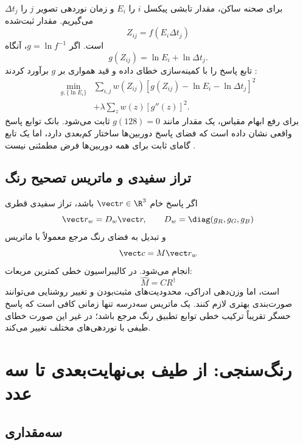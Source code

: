 برای صحنه ساکن، مقدار تابشی پیکسل \(i\) را \(E_i\) و زمان نوردهی تصویر \(j\) را \(\Delta t_j\)
می‌گیریم. مقدار ثبت‌شده
\begin{equation}
Z_{ij}=f(E_i\Delta t_j)
\end{equation}
است. اگر \(g=\ln f^{-1}\)، آنگاه
\begin{equation}
g(Z_{ij})=\ln E_i+\ln\Delta t_j.
\label{eq:response-log}
\end{equation}
 تابع پاسخ را با کمینه‌سازی خطای داده و قید همواری بر \(g\) برآورد کردند
\cite{debevec1997hdr}:
\begin{align}
\min_{g,\{\ln E_i\}}
&\sum_{i,j}w(Z_{ij})
\left[g(Z_{ij})-\ln E_i-\ln\Delta t_j\right]^2\\
&+\lambda\sum_z w(z)\left[g''(z)\right]^2.
\label{eq:debevec-objective}
\end{align}
برای رفع ابهام مقیاس، یک مقدار مانند \(g(128)=0\) ثابت می‌شود. بانک توابع پاسخ واقعی نشان داده
است که فضای پاسخ دوربین‌ها ساختار کم‌بعدی دارد، اما یک تابع گامای ثابت برای همه دوربین‌ها فرض
مطمئنی نیست \cite{grossberg2003crf}.

\subsection{تراز سفیدی و ماتریس تصحیح رنگ}

اگر پاسخ خام \(\vect r\in\R^3\) باشد، تراز سفیدی قطری
\begin{equation}
\vect r_w=D_w\vect r,
\qquad D_w=\diag(g_R,g_G,g_B)
\end{equation}
و تبدیل به فضای رنگ مرجع معمولاً با ماتریس
\begin{equation}
\vect c=M\vect r_w
\end{equation}
انجام می‌شود. در کالیبراسیون خطی کمترین مربعات:
\begin{equation}
\widehat M= C R^{\dagger}
\end{equation}
است، اما وزن‌دهی ادراکی، محدودیت‌های مثبت‌بودن و تغییر روشنایی می‌توانند صورت‌بندی بهتری لازم کنند.
یک ماتریس سه‌درسه تنها زمانی کافی است که پاسخ حسگر تقریباً ترکیب خطی توابع تطبیق رنگ مرجع باشد؛
در غیر این صورت خطای طیفی با نوردهی‌های مختلف تغییر می‌کند.

\section{رنگ‌سنجی: از طیف بی‌نهایت‌بعدی تا سه عدد}

\subsection{سه‌مقداری }

